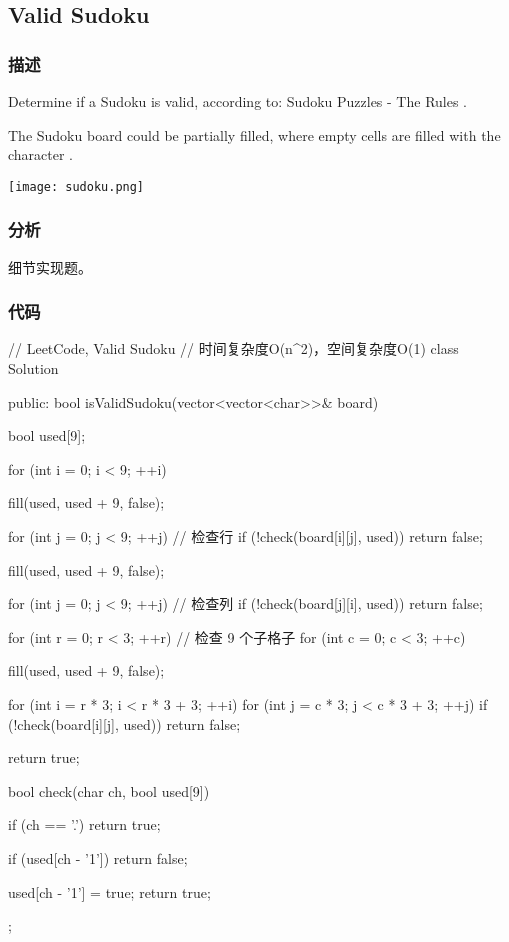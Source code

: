 \subsection{Valid Sudoku} %
\label{sec:valid-sudoku}


\subsubsection{描述}
Determine if a Sudoku is valid, according to: Sudoku Puzzles - The Rules  .

The Sudoku board could be partially filled, where empty cells are filled with the character .

\begin{center}
\texttt{[image: sudoku.png]}\\
\label{fig:sudoku}
\end{center}

\subsubsection{分析}
细节实现题。


\subsubsection{代码}
\begin{Code}
// LeetCode, Valid Sudoku
// 时间复杂度O(n^2)，空间复杂度O(1)
class Solution {
public:
    bool isValidSudoku(vector<vector<char>>& board) {
        bool used[9];

        for (int i = 0; i < 9; ++i) {
            fill(used, used + 9, false);

            for (int j = 0; j < 9; ++j) // 检查行
                if (!check(board[i][j], used))
                    return false;

            fill(used, used + 9, false);

            for (int j = 0; j < 9; ++j) // 检查列
                if (!check(board[j][i], used))
                    return false;
        }

        for (int r = 0; r < 3; ++r) // 检查 9 个子格子
            for (int c = 0; c < 3; ++c) {
                fill(used, used + 9, false);

                for (int i = r * 3; i < r * 3 + 3; ++i)
                    for (int j = c * 3; j < c * 3 + 3; ++j)
                        if (!check(board[i][j], used))
                            return false;
            }

        return true;
    }

    bool check(char ch, bool used[9]) {
        if (ch == '.') return true;

        if (used[ch - '1']) return false;

        used[ch - '1'] = true;
        return true;
    }
};
\end{Code}


